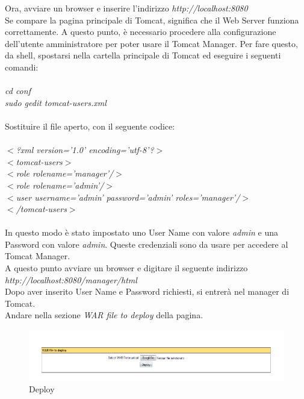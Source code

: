 Ora, avviare un browser e inserire l'indirizzo \textit{http://localhost:8080}\\
Se compare la pagina principale di Tomcat, significa che il Web Server funziona correttamente.
A questo punto, \`e necessario procedere alla configurazione dell'utente amministratore per poter usare il Tomcat Manager.
Per fare questo, da shell, spostarsi nella cartella principale di Tomcat ed eseguire i seguenti comandi:\\
\\
\textit{cd conf}\\
\textit{sudo gedit tomcat-users.xml}\\
\\
Sostituire il file aperto, con il seguente codice:\\
\\
\textit{$ < $?xml version='1.0' encoding='utf-8'?$ > $}\\
\textit{$ < $tomcat-users$ > $}\\
\textit{ $ < $role rolename='manager'/$ > $}\\
\textit{ $ < $role rolename='admin'/$ > $}\\
\textit{ $ < $user username='admin' password='admin' roles='manager'/$ > $}\\
\textit{$ < $/tomcat-users$ > $} \\
\\
In questo modo \`e stato impostato uno User Name con valore \textit{admin} e una Password con valore \textit{admin}. Queste credenziali sono da usare per accedere al Tomcat Manager.\\
A questo punto avviare un browser e digitare il seguente indirizzo\\ \textit{http://localhost:8080/manager/html}\\
Dopo aver inserito User Name e Password richiesti, si entrer\`a nel manager di Tomcat.\\
Andare nella sezione \textit{WAR file to deploy} della pagina.\\

\begin{figure}[!ht]
\centering
\includegraphics[scale=0.7]{images/DeployTomcat.png}
\caption{Deploy}
\end{figure}
 
